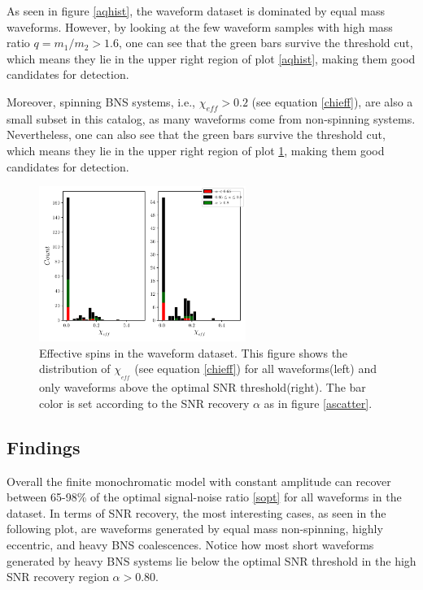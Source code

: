 As seen in figure \ref{aqhist}, the waveform dataset is dominated by equal mass waveforms. However, by looking at the few waveform samples with high mass ratio $q=m_1/m_2>1.6$, one can see that the green bars survive the threshold cut, which means they lie in the upper right region of plot \ref{aqhist}, making them good candidates for detection.
 

\newpage

Moreover, spinning BNS systems, i.e., $\chi_{eff}>0.2$ (see equation \ref{chieff}), are also a small subset in this catalog, as many waveforms come from non-spinning systems. Nevertheless, one can also see that the green bars survive the threshold cut, which means they lie in the upper right region of plot \ref{achihist}, making them good candidates for detection.

\begin{figure}[hbt!]
\begin{center}
\includegraphics[width=0.6\textwidth, angle=0]{images/Data_analysis/results/alpha_chihist.pdf}
\captionsetup{width=0.8\textwidth}
\caption[Effective spins in the waveform dataset]{Effective spins in the waveform dataset. This figure shows the distribution of $\chi_{_{eff}}$ (see equation \ref{chieff}) for all waveforms(left) and only waveforms above the optimal SNR threshold(right). The bar color is set according to the SNR recovery $\alpha$ as in figure \ref{ascatter}.}
\label{achihist}
\end{center}
\end{figure}

\FloatBarrier


\subsection*{Findings}
Overall the finite monochromatic model with constant amplitude can recover between 65-98\% of the optimal signal-noise ratio \ref{sopt} for all waveforms in the dataset. In terms of SNR recovery, the most interesting cases, as seen in the following plot, are waveforms generated by equal mass non-spinning, highly eccentric, and heavy BNS coalescences. Notice how most short waveforms generated by heavy BNS systems lie below the optimal SNR threshold in the high SNR recovery region $\alpha>0.80$.

